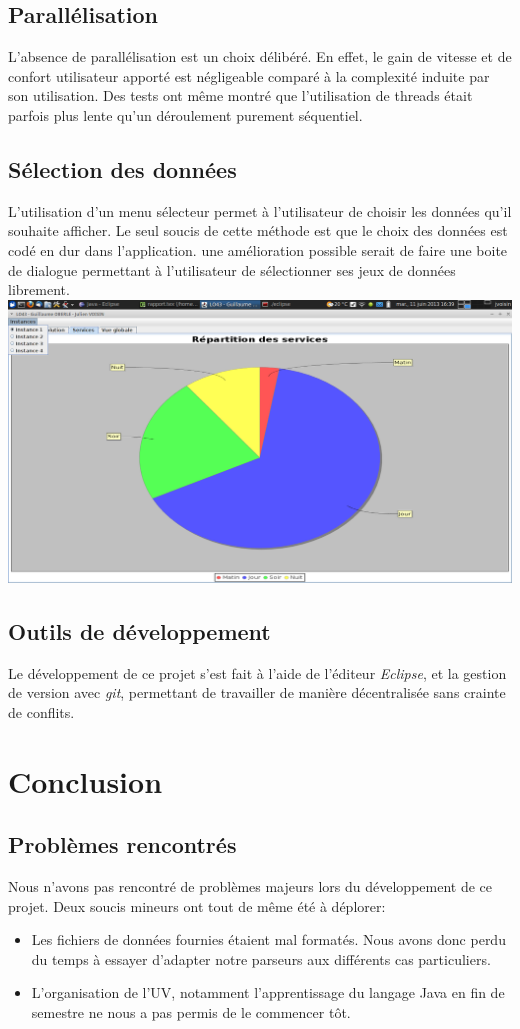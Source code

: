 \documentclass[12pt]{article}
\begin{document}
\subsection{Parallélisation}
L'absence de parallélisation est un choix délibéré. En effet, le gain de vitesse et de confort utilisateur apporté est négligeable comparé à la complexité induite par son utilisation. Des tests ont même montré que l'utilisation de threads était parfois plus lente qu'un déroulement purement séquentiel.

\subsection{Sélection des données}
L'utilisation d'un menu sélecteur permet à l'utilisateur de choisir les données qu'il souhaite afficher. Le seul soucis de cette méthode est que le choix des données est codé en dur dans l'application. une amélioration possible serait de faire une boite de dialogue permettant à l'utilisateur de sélectionner ses jeux de données librement.\\
\includegraphics[width=\textwidth]{menu.png}

\subsection{Outils de développement}
Le développement de ce projet s'est fait à l'aide de l'éditeur \emph{Eclipse}, et la gestion de version avec \emph{git}, permettant de travailler de manière décentralisée sans crainte de conflits.

\newpage
\section{Conclusion}
\subsection{Problèmes rencontrés}
Nous n'avons pas rencontré de problèmes majeurs lors du développement de ce projet. Deux soucis mineurs ont tout de même été à déplorer:
\begin{itemize}
	\item Les fichiers de données fournies étaient mal formatés. Nous avons donc perdu du temps à essayer d'adapter notre parseurs aux différents cas particuliers.
	\item L'organisation de l'UV, notamment l'apprentissage du langage Java en fin de semestre ne nous a pas permis de le commencer tôt.
\end{itemize}
\end{document}
